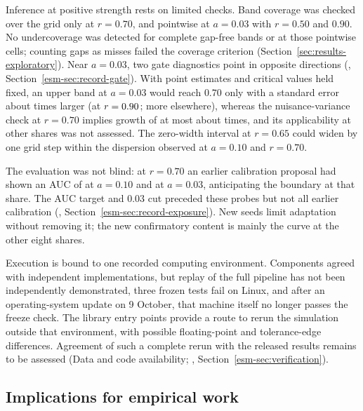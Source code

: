 Inference at positive strength rests on limited checks. Band coverage was checked over the grid only at $r=0.70$, and pointwise at $a=0.03$ with $r=0.50$ and $0.90$. No undercoverage was detected for complete gap-free bands or at those pointwise cells; counting gaps as misses failed the coverage criterion (Section~\ref{sec:results-exploratory}). Near $a=0.03$, two gate diagnostics point in opposite directions (\esmresource, Section~\ref{esm-sec:record-gate}). With point estimates and critical values held fixed, an upper band at $a=0.03$ would reach $0.70$ only with a standard error about  times larger (at $r=\resultnum{j.b.margin.a0300.se_factor.min.r}{0.90}$; more elsewhere), whereas the nuisance-variance check at $r=0.70$ implies growth of at most about  times, and its applicability at other shares was not assessed. The zero-width interval at $r=0.65$ could widen by one grid step within the dispersion observed at $a=0.10$ and $r=0.70$.

The evaluation was not blind: at $r=0.70$ an earlier calibration proposal had shown an AUC of  at $a=0.10$ and  at $a=0.03$, anticipating the boundary at that share. The AUC target and $0.03$ cut preceded these probes but not all earlier calibration (\esmresource, Section~\ref{esm-sec:record-exposure}). New seeds limit adaptation without removing it; the new confirmatory content is mainly the curve at the other eight shares.

Execution is bound to one recorded computing environment. Components agreed with independent implementations, but replay of the full pipeline has not been independently demonstrated, three frozen tests fail on Linux, and after an operating-system update on 9 October, that machine itself no longer passes the freeze check. The library entry points provide a route to rerun the simulation outside that environment, with possible floating-point and tolerance-edge differences. Agreement of such a complete rerun with the released results remains to be assessed (Data and code availability; \esmresource, Section~\ref{esm-sec:verification}).

\subsection{Implications for empirical work}\label{sec:implications}

